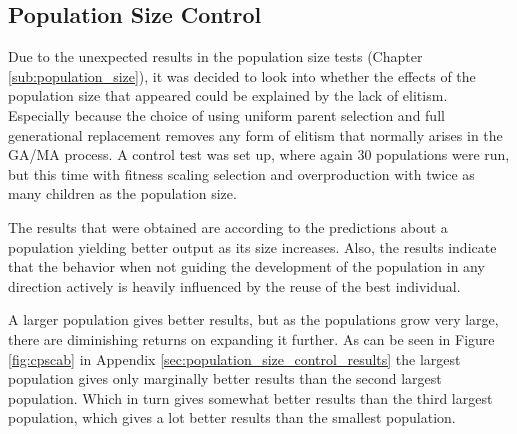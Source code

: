 \subsection{Population Size Control} %
\label{sub:population_size_control}

Due to the unexpected results in the population size tests (Chapter \ref{sub:population_size}), it was decided to look into whether the effects of the population size that appeared could be explained by the lack of elitism. Especially because the choice of using uniform parent selection and full generational replacement removes any form of elitism that normally arises in the GA/MA process. A control test was set up, where again 30 populations were run, but this time with fitness scaling selection and overproduction with twice as many children as the population size.

The results that were obtained are according to the predictions about a population yielding better output as its size increases. Also, the results indicate that the behavior when not guiding the development of the population in any direction actively is heavily influenced by the reuse of the best individual. 

A larger population gives better results, but as the populations grow very large, there are diminishing returns on expanding it further. As can be seen in Figure \ref{fig:cpscab} in Appendix \ref{sec:population_size_control_results} the largest population gives only marginally better results than the second largest population. Which in turn gives somewhat better results than the third largest population, which gives a lot better results than the smallest population.



